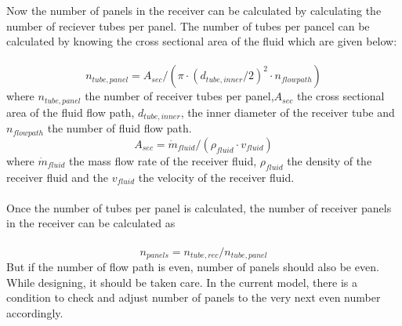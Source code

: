 Now the number of panels in the receiver can be calculated by calculating the number of reciever tubes per panel. The number of tubes per pancel can be calculated by knowing the cross sectional area of the fluid which are given below:\\\\
\begin{equation}
	n_{tube,panel} = A_{sec} / (\pi \cdot (d_{tube,inner} / 2)^2 \cdot n_{flowpath})
\end{equation}
where $n_{tube,panel}$ the number of receiver tubes per panel,$A_{sec}$ the cross sectional area of the fluid flow path, $d_{tube,inner}$, the inner diameter of the receiver tube and $n_{flowpath}$ the number of fluid flow path.
\begin{equation}
	A_{sec} = \dot m_{fluid} / (\rho_{fluid} \cdot v_{fluid})
\end{equation}
where $\dot m_{fluid}$ the mass flow rate of the receiver fluid, $\rho_{fluid}$ the density of the receiver fluid and the $v_{fluid}$ the velocity of the receiver fluid.\\\\
Once the number of tubes per panel is calculated, the number of receiver panels in the receiver can be calculated as\\\\
\begin{equation}
	n_{panels} = n_{tube,rec} / n_{tube,panel}
\end{equation}
But if the number of flow path is even, number of panels should also be even. While designing, it should be taken care. In the current model, there is a condition to check and adjust number of panels to the very next even number accordingly. \\\\
